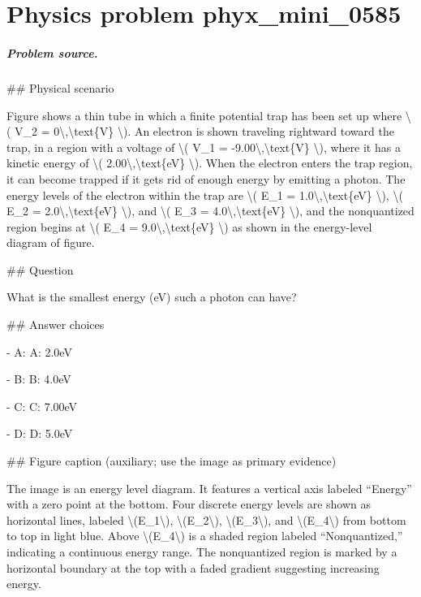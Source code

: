 
\chapter{Physics problem phyx\_mini\_0585}
\label{ch:PhyXMiniProblems_problem_phyx_mini_0585}

\paragraph{Problem source.}
\#\# Physical scenario

Figure shows a thin tube in which a finite potential trap has been set up where \textbackslash{}( V\_2 = 0\textbackslash{},\textbackslash{}text\{V\} \textbackslash{}). An electron is shown traveling rightward toward the trap, in a region with a voltage of \textbackslash{}( V\_1 = -9.00\textbackslash{},\textbackslash{}text\{V\} \textbackslash{}), where it has a kinetic energy of \textbackslash{}( 2.00\textbackslash{},\textbackslash{}text\{eV\} \textbackslash{}). When the electron enters the trap region, it can become trapped if it gets rid of enough energy by emitting a photon. The energy levels of the electron within the trap are \textbackslash{}( E\_1 = 1.0\textbackslash{},\textbackslash{}text\{eV\} \textbackslash{}), \textbackslash{}( E\_2 = 2.0\textbackslash{},\textbackslash{}text\{eV\} \textbackslash{}), and \textbackslash{}( E\_3 = 4.0\textbackslash{},\textbackslash{}text\{eV\} \textbackslash{}), and the nonquantized region begins at \textbackslash{}( E\_4 = 9.0\textbackslash{},\textbackslash{}text\{eV\} \textbackslash{}) as shown in the energy-level diagram of figure.

\#\# Question

What is the smallest energy (eV) such a photon can have?

\#\# Answer choices

- A: A: 2.0eV

- B: B: 4.0eV

- C: C: 7.00eV

- D: D: 5.0eV

\#\# Figure caption (auxiliary; use the image as primary evidence)

The image is an energy level diagram. It features a vertical axis labeled “Energy” with a zero point at the bottom. Four discrete energy levels are shown as horizontal lines, labeled \textbackslash{}(E\_1\textbackslash{}), \textbackslash{}(E\_2\textbackslash{}), \textbackslash{}(E\_3\textbackslash{}), and \textbackslash{}(E\_4\textbackslash{}) from bottom to top in light blue. Above \textbackslash{}(E\_4\textbackslash{}) is a shaded region labeled “Nonquantized,” indicating a continuous energy range. The nonquantized region is marked by a horizontal boundary at the top with a faded gradient suggesting increasing energy.


